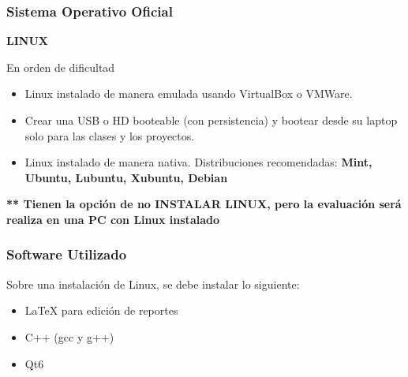 \begin{frame}
\frametitle{Sistema Operativo Oficial}

\textbf{LINUX}
\begin{block}{En orden de dificultad}
\begin{itemize}
\item Linux instalado de manera emulada usando VirtualBox o VMWare.
\item Crear una USB o HD booteable (con persistencia) y bootear desde su laptop solo para las clases y los proyectos.
\item Linux instalado de manera nativa. Distribuciones recomendadas: \textbf{Mint, Ubuntu, Lubuntu, Xubuntu, Debian}
\end{itemize}
\end{block}
\textbf{** Tienen la opción de no INSTALAR LINUX, pero la evaluación será realiza en una PC con Linux instalado}
\end{frame}


\begin{frame}
\frametitle{Software Utilizado}
Sobre una instalación de Linux, se debe instalar lo siguiente:
\begin{itemize}
\item LaTeX para edición de reportes
\item C++ (gcc y g++)
\item Qt6
\end{itemize}
\end{frame}

